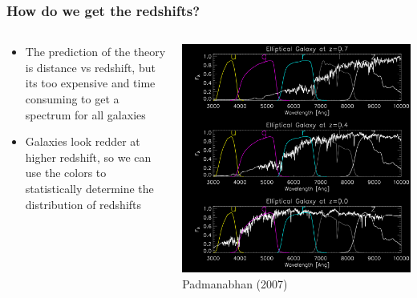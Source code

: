 \documentclass{beamer}
\begin{document}
\frame
{
    \frametitle{How do we get the redshifts?}


    \begin{columns}
        \begin{column}{0.5\textwidth}    
            \begin{itemize}

                \item The prediction of the theory is distance vs redshift, but
                    its too expensive and time consuming to get a spectrum
                    for all galaxies

                \item Galaxies look redder at higher redshift, so we can use
                    the colors to statistically determine the distribution
                    of redshifts

            \end{itemize}
        \end{column}
        \begin{column}{0.5\textwidth}
            \begin{center}
                \includegraphics[width=\textwidth]{lrg_spectrum_inv.png}
                {\tiny Padmanabhan (2007)}
            \end{center}
        \end{column}
    \end{columns}


}
\end{document}
